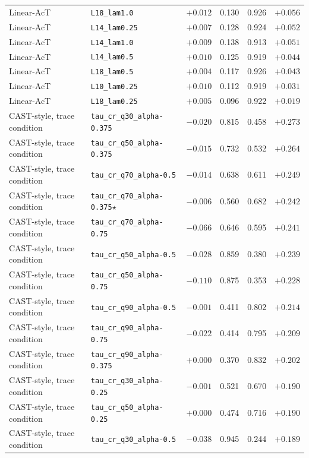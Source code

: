 {\begin{longtable}{l|l|c|cc|c}
Linear-AcT & \texttt{L18\_lam1.0} & $+0.012$ & 0.130 & 0.926 & $+0.056$ \\
Linear-AcT & \texttt{L14\_lam0.25} & $+0.007$ & 0.128 & 0.924 & $+0.052$ \\
Linear-AcT & \texttt{L14\_lam1.0} & $+0.009$ & 0.138 & 0.913 & $+0.051$ \\
Linear-AcT & \texttt{L14\_lam0.5} & $+0.010$ & 0.125 & 0.919 & $+0.044$ \\
Linear-AcT & \texttt{L18\_lam0.5} & $+0.004$ & 0.117 & 0.926 & $+0.043$ \\
Linear-AcT & \texttt{L10\_lam0.25} & $+0.010$ & 0.112 & 0.919 & $+0.031$ \\
Linear-AcT & \texttt{L18\_lam0.25} & $+0.005$ & 0.096 & 0.922 & $+0.019$ \\
CAST-style, trace condition & \texttt{tau\_cr\_q30\_alpha-0.375} & $-0.020$ & 0.815 & 0.458 & $+0.273$ \\
CAST-style, trace condition & \texttt{tau\_cr\_q50\_alpha-0.375} & $-0.015$ & 0.732 & 0.532 & $+0.264$ \\
CAST-style, trace condition & \texttt{tau\_cr\_q70\_alpha-0.5} & $-0.014$ & 0.638 & 0.611 & $+0.249$ \\
CAST-style, trace condition & \texttt{tau\_cr\_q70\_alpha-0.375}$\star$ & $-0.006$ & 0.560 & 0.682 & $+0.242$ \\
CAST-style, trace condition & \texttt{tau\_cr\_q70\_alpha-0.75} & $-0.066$ & 0.646 & 0.595 & $+0.241$ \\
CAST-style, trace condition & \texttt{tau\_cr\_q50\_alpha-0.5} & $-0.028$ & 0.859 & 0.380 & $+0.239$ \\
CAST-style, trace condition & \texttt{tau\_cr\_q50\_alpha-0.75} & $-0.110$ & 0.875 & 0.353 & $+0.228$ \\
CAST-style, trace condition & \texttt{tau\_cr\_q90\_alpha-0.5} & $-0.001$ & 0.411 & 0.802 & $+0.214$ \\
CAST-style, trace condition & \texttt{tau\_cr\_q90\_alpha-0.75} & $-0.022$ & 0.414 & 0.795 & $+0.209$ \\
CAST-style, trace condition & \texttt{tau\_cr\_q90\_alpha-0.375} & $+0.000$ & 0.370 & 0.832 & $+0.202$ \\
CAST-style, trace condition & \texttt{tau\_cr\_q30\_alpha-0.25} & $-0.001$ & 0.521 & 0.670 & $+0.190$ \\
CAST-style, trace condition & \texttt{tau\_cr\_q50\_alpha-0.25} & $+0.000$ & 0.474 & 0.716 & $+0.190$ \\
CAST-style, trace condition & \texttt{tau\_cr\_q30\_alpha-0.5} & $-0.038$ & 0.945 & 0.244 & $+0.189$ \\

\end{longtable}}
